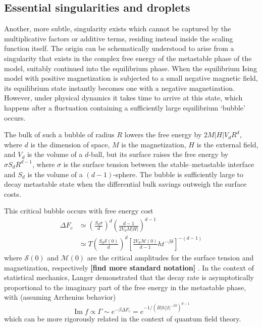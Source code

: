 \documentclass[
  aps,
  prb,
  reprint,
  longbibliography,
  floatfix
]{revtex4-2}
\begin{document}
\subsection{Essential singularities and droplets}

Another, more subtle, singularity exists which cannot be captured by the
multiplicative factors or additive terms, residing instead inside the scaling
function itself. The origin can be schematically understood to arise from a
singularity that exists in the complex free energy of the metastable phase of
the model, suitably continued into the equilibrium phase. When the equilibrium
Ising model with positive magnetization is subjected to a small negative
magnetic field, its equilibrium state instantly becomes one with a negative
magnetization. However, under physical dynamics it takes time to arrive at this
state, which happens after a fluctuation containing a sufficiently large
equilibrium `bubble' occurs.

The bulk of such a bubble of radius $R$ lowers the free energy by
$2M|H|V_dR^d$, where $d$ is the dimension of space, $M$ is the magnetization,
$H$ is the external field, and $V_d$ is the volume of a $d$-ball, but its
surface raises the free energy by $\sigma S_dR^{d-1}$, where $\sigma$ is the
surface tension between the stable--metastable interface and $S_d$ is the
volume of a $(d-1)$-sphere. The bubble is sufficiently large to decay
metastable state when the differential bulk savings outweigh the surface costs.

This critical bubble occurs with free energy cost
\begin{equation}
  \begin{aligned}
    \Delta F_c
      &\simeq\left(\frac{S_d\sigma}d\right)^d\left(\frac{d-1}{2V_dM|H|}\right)^{d-1} \\
      &\simeq T\left(\frac{S_d\mathcal S(0)}d\right)^d\left[\frac{2V_d\mathcal M(0)}{d-1}ht^{-\beta\delta}\right]^{-(d-1)}
  \end{aligned}
\end{equation}
where $\mathcal S(0)$ and $\mathcal M(0)$ are the critical amplitudes for the
surface tension and magnetization, respectively \textbf{[find more standard
notation]} \cite{Kent-Dobias_2020_Novel}.
In the context of statistical mechanics, Langer demonstrated that the decay rate is asymptotically proportional to the imaginary part of the free energy in the metastable phase, with (assuming Arrhenius behavior)
\begin{equation}
  \operatorname{Im}f\propto\Gamma\sim e^{-\beta\Delta F_c}=e^{-1/(B|h||t|^{-\beta\delta})^{d-1}}
\end{equation}
which can be more rigorously related in the context of quantum field theory.
  
\end{document}
